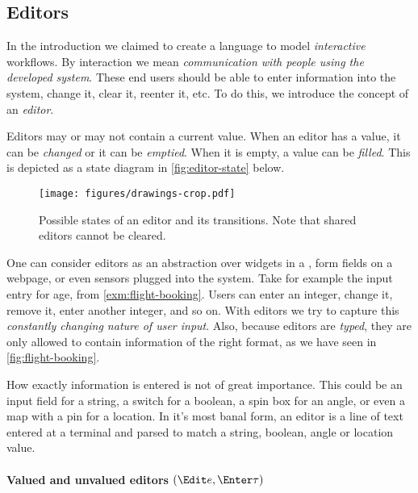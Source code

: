 \subsection{Editors}

In the introduction we claimed to create a language to model \emph{interactive} workflows.
By interaction we mean \emph{communication with people using the developed system}.
These end users should be able to enter information into the system,
change it, clear it, reenter it, etc.
To do this, we introduce the concept of an \emph{editor}.

Editors may or may not contain a current value.
When an editor has a value, it can be \emph{changed} or it can be \emph{emptied}.
When it is empty, a value can be \emph{filled}.
This is depicted as a state diagram in \autoref{fig:editor-state} below.

\begin{figure}[h]
  \centering
  \texttt{[image: figures/drawings-crop.pdf]}
  \caption{
    Possible states of an editor and its transitions.
    Note that shared editors cannot be cleared.
  }
  \label{fig:editor-state}
\end{figure}

One can consider editors as an abstraction over widgets in a \GUI,
form fields on a webpage,
or even sensors plugged into the system.
Take for example the input entry for age,
from \autoref{exm:flight-booking}.
Users can enter an integer, change it, remove it, enter another integer, and so on.
With editors we try to capture this \emph{constantly changing nature of user input}.
Also, because editors are \emph{typed},
they are only allowed to contain information of the right format,
as we have seen in \autoref{fig:flight-booking}.

How exactly information is entered is not of great importance.
This could be an input field for a string,
a switch for a boolean,
a spin box for an angle,
or even a map with a pin for a location.
In it's most banal form,
an editor is a line of text entered at a terminal and parsed to match
a string, boolean, angle or location value.



\paragraph{Valued and unvalued editors $(\Edit e, \Enter \tau)$}

